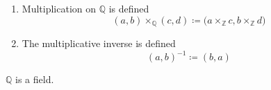 \begin{definition}[Rationals]
\begin{enumerate}
        \item Multiplication on $\mathbb{Q}$ is defined 
        \begin{equation}
          (a, b) \times_{\mathbb{Q}} (c, d) \coloneqq \big( a \times_{\mathbb{Z}} c, b \times_{\mathbb{Z}} d \big)
        \end{equation} 

        \item The multiplicative inverse is defined 
        \begin{equation}
          (a, b)^{-1} \coloneqq (b, a)
        \end{equation}
      \end{enumerate}
    \end{definition}

    \begin{theorem}
      $\mathbb{Q}$ is a field. 
    \end{theorem} 

